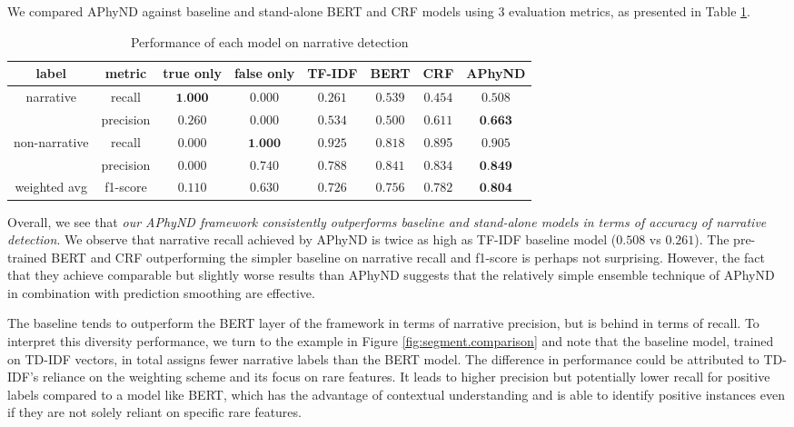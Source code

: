 \documentclass[preprint,12pt]{elsarticle}
\begin{document}
We compared APhyND against baseline and stand-alone BERT and CRF models using $3$ evaluation metrics, as presented in Table \ref{table:all.models.result}.

\begin{table}[h!]
    \centering
     \def\arraystretch{1.5}
     \begin{tabular}{c c | c c c c c c}
      \hline
      label & metric  & true only & false only & TF-IDF & BERT & CRF &  APhyND  \\ \hline
       \multirow{2}{*}{narrative} 
       &  recall & $\textbf{1.000}$ & $0.000$ & $0.261$ & $0.539$ & $0.454$ & $0.508$ \\
       & precision & $0.260$ & $0.000$ & $0.534$ &	$0.500$	& $0.611$	& $\textbf{0.663}$ \\ \hline
       \multirow{2}{*}{non-narrative} & recall	& $0.000$ &	$\textbf{1.000}$ &	$0.925$ &	$0.818$ &	$0.89$5 &	$0.905$ \\
      & precision &	$0.000$ &	$0.740$ &	$0.788$ &	$0.841$ &	$0.834$ & $\textbf{0.849}$ \\ \hline
    weighted avg & f1-score  & $0.110$ & $0.630$ & $0.726$ & $0.756$ & $0.782$ & $\textbf{0.804}$\\
\hline
\end{tabular}
\caption{Performance of each model on narrative detection}
    \label{table:all.models.result}
\end{table}

Overall, we see that \emph{our APhyND framework consistently outperforms baseline and stand-alone models in terms of accuracy of narrative detection}. We observe that narrative recall achieved by APhyND is twice as high as TF-IDF baseline model ($0.508$ vs $0.261$). The pre-trained BERT and CRF outperforming the simpler baseline on narrative recall and f1-score is perhaps not surprising. However, the fact that they achieve comparable but slightly worse results than APhyND suggests that the relatively simple ensemble technique of APhyND in combination with prediction smoothing are effective.

The baseline tends to outperform the BERT layer of the framework in terms of narrative precision, but is behind in terms of recall. To interpret this diversity performance, we turn to the example in Figure \ref{fig:segment.comparison} and note that the baseline model, trained on TD-IDF vectors, in total assigns fewer narrative labels than the BERT model. The difference in performance could be attributed to TD-IDF's reliance on the weighting scheme and its focus on rare features. It leads to higher precision but potentially lower recall for positive labels compared to a model like BERT, which has the advantage of contextual understanding and is able to identify positive instances even if they are not solely reliant on specific rare features.
\end{document}
